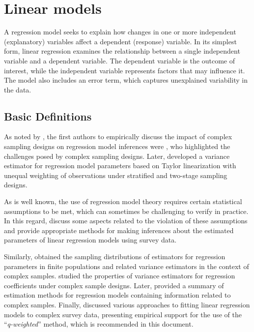 \documentclass[
  12pt,
]{book}
\begin{document}
\hypertarget{linear-models}{%
\section{Linear models}\label{linear-models}}

A regression model seeks to explain how changes in one or more independent (explanatory) variables affect a dependent (response) variable. In its simplest form, linear regression examines the relationship between a single independent variable and a dependent variable. The dependent variable is the outcome of interest, while the independent variable represents factors that may influence it. The model also includes an error term, which captures unexplained variability in the data.

\hypertarget{basic-definitions}{%
\subsection{Basic Definitions}\label{basic-definitions}}

As noted by \citet{Heeringa_West_Berglund_2017}, the first authors to empirically discuss the impact of complex sampling designs on regression model inferences were \citet{kish1974inference}, who highlighted the challenges posed by complex sampling designs. Later, \citet{fuller1975regression} developed a variance estimator for regression model parameters based on Taylor linearization with unequal weighting of observations under stratified and two-stage sampling designs.

As is well known, the use of regression model theory requires certain statistical assumptions to be met, which can sometimes be challenging to verify in practice. In this regard, \citet{shah1977inference} discuss some aspects related to the violation of these assumptions and provide appropriate methods for making inferences about the estimated parameters of linear regression models using survey data.

Similarly, \citet{binder1983variances} obtained the sampling distributions of estimators for regression parameters in finite populations and related variance estimators in the context of complex samples. \citet{skinner1989analysis} studied the properties of variance estimators for regression coefficients under complex sample designs. Later, \citet{fuller2002regression} provided a summary of estimation methods for regression models containing information related to complex samples. Finally, \citet{pfeffermann2011modelling} discussed various approaches to fitting linear regression models to complex survey data, presenting empirical support for the use of the ``\emph{q-weighted}'' method, which is recommended in this document.
\end{document}

